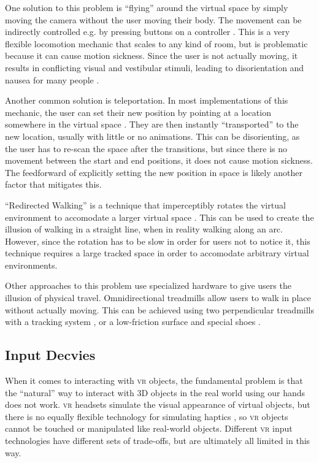 \documentclass{tufte-book} %
\begin{document}
One solution to this problem is ``flying'' around the virtual space by simply moving the camera without the user moving their body. The movement can be indirectly controlled e.g. by pressing buttons on a controller \cite{bowman1996evaluation} \cite{bowman1995user}. This is a very flexible locomotion mechanic that scales to any kind of room, but is problematic because it can cause motion sickness. Since the user is not actually moving, it results in conflicting visual and vestibular stimuli, leading to disorientation and nausea for many people \cite{akiduki2003visual}.

Another common solution is teleportation. In most implementations of this mechanic, the user can set their new position by pointing at a location somewhere in the virtual space \cite{bozgeyikli2016point}. They are then instantly ``transported'' to the new location, usually with little or no animations. This can be disorienting, as the user has to re-scan the space after the transitions, but since there is no movement between the start and end positions, it does not cause motion sickness. The feedforward of explicitly setting the new position in space is likely another factor that mitigates this.

``Redirected Walking'' is a technique that imperceptibly rotates the virtual environment to accomodate a larger virtual space \cite{razzaque2001redirected}. This can be used to create the illusion of walking in a straight line, when in reality walking along an arc. However, since the rotation has to be slow in order for users not to notice it, this technique requires a large tracked space in order to accomodate arbitrary virtual environments.

Other approaches to this problem use specialized hardware to give users the illusion of physical travel. Omnidirectional treadmills allow users to walk in place without actually moving. This can be achieved using two perpendicular treadmills with a tracking system \cite{darken1997omni}, or a low-friction surface and special shoes \cite{warren2017omni}.

\subsection{Input Decvies}
When it comes to interacting with \textsc{vr} objects, the fundamental problem is that the ``natural'' way to interact with 3D objects in the real world using our hands does not work. \textsc{vr} headsets simulate the visual appearance of virtual objects, but there is no equally flexible technology for simulating haptics \cite{burdea1999keynote}, so \textsc{vr} objects cannot be touched or manipulated like real-world objects. Different \textsc{vr} input technologies have different sets of trade-offs, but are ultimately all limited in this way.
\end{document}
